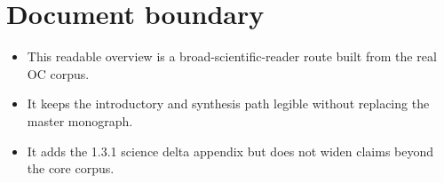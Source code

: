 \section*{Document boundary}
\begin{itemize}[leftmargin=*]
\item This readable overview is a broad-scientific-reader route built from the real OC corpus.
\item It keeps the introductory and synthesis path legible without replacing the master monograph.
\item It adds the 1.3.1 science delta appendix but does not widen claims beyond the core corpus.
\end{itemize}
